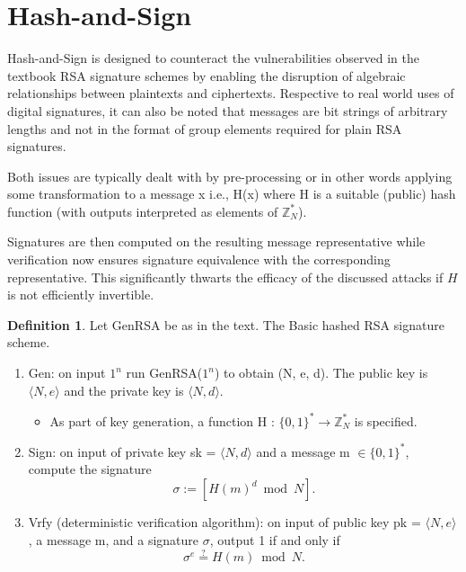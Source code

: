 \documentclass[]{final_report}
\theoremstyle{definition}
\newtheorem{definition}{Definition}[chapter]
\begin{document}
\section{Hash-and-Sign}
\label{def:hashed rsa}
Hash-and-Sign is designed to counteract the vulnerabilities observed in the textbook RSA signature schemes by enabling the disruption of algebraic relationships between plaintexts and ciphertexts. Respective to real world uses of digital signatures, it can also be noted that messages are bit strings of arbitrary lengths and not in the format of group elements required for plain RSA signatures.

Both issues are typically dealt with by pre-processing or in other words applying some transformation to a message x i.e., H(x) where H is a suitable (public) hash function (with outputs interpreted as elements of $\mathbb{Z}^*_{N}$).

Signatures are then computed on the resulting message representative while verification now ensures signature equivalence with the corresponding representative. This significantly thwarts the efficacy of the discussed attacks if \( H \) is not efficiently invertible.

\begin{definition}
\label{def:hashed rsa}
Let GenRSA be as in the text. The Basic hashed RSA signature scheme.
\begin{mdframed}
\begin{enumerate}
    \item Gen: on input $1^n$ run GenRSA($1^n$) to obtain (N, e, d). The public key is $\langle N, e \rangle$ and the private key is $\langle N, d \rangle$.
    \begin{itemize}
    \item As part of key generation, a function H : $\{0, 1\}^* \rightarrow \mathbb{Z}^*_{N}$ is specified.
    \end{itemize}

    \item Sign: on input of private key sk = $\langle N, d \rangle$ and a message m $\in \{0, 1\}^*$, compute the signature
\[\sigma := [H(m)^d \bmod N].\]
    \item Vrfy (deterministic verification algorithm):  on input of public key pk = $\langle N, e \rangle$, a message m, and a signature $\sigma$, output 1 if and only if
    \[\sigma^e \stackrel{?}{=} H(m) \bmod N.\]
\end{enumerate}
\end{mdframed}

\end{definition}
\end{document}
